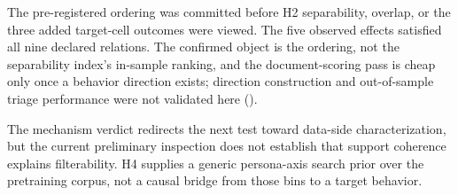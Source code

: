 The pre-registered ordering was committed before H2 separability, overlap, or the
three added target-cell outcomes were viewed. The five observed effects
satisfied all nine declared relations. The confirmed object is the ordering,
not the separability index's in-sample ranking, and the document-scoring pass is
cheap only once a behavior direction exists; direction construction and
out-of-sample triage performance were not validated here
().

The mechanism verdict redirects the next test toward data-side
characterization, but the current preliminary inspection does not establish
that support coherence explains filterability. H4 supplies a generic
persona-axis search prior over the pretraining corpus, not a causal bridge
from those bins to a target behavior.
